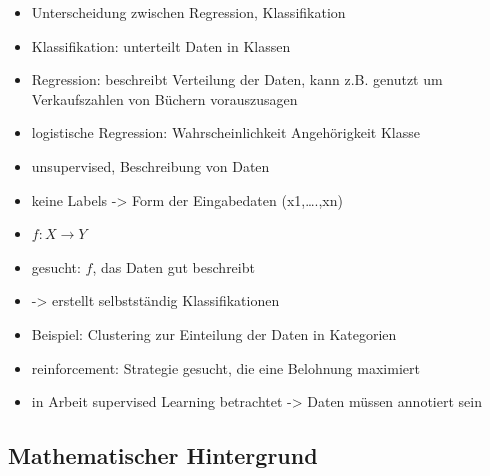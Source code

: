 	\begin{itemize}
		\item Unterscheidung zwischen Regression, Klassifikation
		\item Klassifikation: unterteilt Daten in Klassen
		\item Regression: beschreibt Verteilung der Daten, kann z.B. genutzt um Verkaufszahlen von Büchern vorauszusagen
		\item logistische Regression: Wahrscheinlichkeit Angehörigkeit Klasse
		\item unsupervised, Beschreibung von Daten
		\item keine Labels -> Form der Eingabedaten (x1,….,xn)
		\item $f: X \to Y$
		\item gesucht: $f$, das Daten gut beschreibt
		\item -> erstellt selbstständig Klassifikationen
		\item Beispiel: Clustering zur Einteilung der Daten in Kategorien
		\item reinforcement: Strategie gesucht, die eine Belohnung maximiert
		\item in Arbeit supervised Learning betrachtet -> Daten müssen annotiert sein
	\end{itemize}
	
	\subsection{Mathematischer Hintergrund}
	
